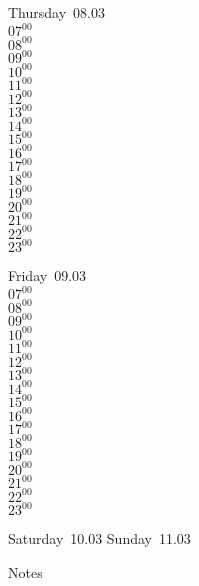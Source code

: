 \documentclass[11pt, a4paper]{book}\usepackage[]{graphicx}\usepackage[]{color}
\begin{document}
\begin{weekdaybox}
  Thursday~08.03\\
  { 
  \vfill
  $07^{00}$\\
$08^{00}$\\
$09^{00}$\\
$10^{00}$\\
$11^{00}$\\
$12^{00}$\\
$13^{00}$\\
$14^{00}$\\
$15^{00}$\\
$16^{00}$\\
$17^{00}$\\
$18^{00}$\\
$19^{00}$\\
$20^{00}$\\
$21^{00}$\\
$22^{00}$\\
$23^{00}$\\
  }
\end{weekdaybox} 
\begin{weekdaybox}
  Friday~09.03\\
  { 
  \vfill
  $07^{00}$\\
$08^{00}$\\
$09^{00}$\\
$10^{00}$\\
$11^{00}$\\
$12^{00}$\\
$13^{00}$\\
$14^{00}$\\
$15^{00}$\\
$16^{00}$\\
$17^{00}$\\
$18^{00}$\\
$19^{00}$\\
$20^{00}$\\
$21^{00}$\\
$22^{00}$\\
$23^{00}$\\
  }
\end{weekdaybox}
\begin{weekendbox}
  Saturday~10.03
  \tcblower
  Sunday~11.03
\end{weekendbox} %
\begin{notebox}
  Notes
\end{notebox}
\clearpage
\end{document}
